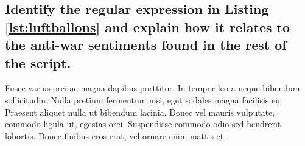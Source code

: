\documentclass[11pt]{scrartcl} %
\begin{document}

\subsection{Identify the regular expression in Listing \ref{lst:luftballons} and explain how it relates to the anti-war sentiments found in the rest of the script.}

Fusce varius orci ac magna dapibus porttitor. In tempor leo a neque bibendum sollicitudin. Nulla pretium fermentum nisi, eget sodales magna facilisis eu. Praesent aliquet nulla ut bibendum lacinia. Donec vel mauris vulputate, commodo ligula ut, egestas orci. Suspendisse commodo odio sed hendrerit lobortis. Donec finibus eros erat, vel ornare enim mattis et.

\end{document}
